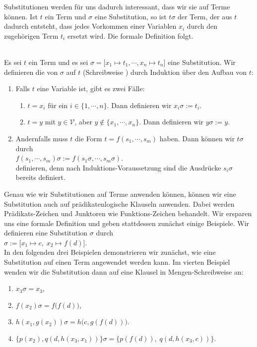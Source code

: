 \noindent
Substitutionen werden für uns dadurch interessant, dass wir sie auf Terme  können.  Ist $t$ ein
Term und $\sigma$ eine Substitution, so ist $t\sigma$ der Term, der aus $t$ dadurch entsteht, dass jedes
Vorkommen einer Variablen $x_i$ durch den zugehörigen Term $t_i$ ersetzt wird.  Die formale Definition folgt. 
\begin{Definition}
\hspace*{\fill} \\
Es sei $t$ ein Term und es sei $\sigma = \bigl[ x_1 \mapsto t_1, \cdots, x_n \mapsto t_n \bigr]$
eine Substitution. Wir definieren die  von $\sigma$ auf $t$
(Schreibweise )  durch Induktion über 
den Aufbau von $t$: 
\begin{enumerate}
\item Falls $t$ eine Variable ist, gibt es zwei Fälle:
  \begin{enumerate}
  \item $t = x_i$ für ein $i\in\{1,\cdots,n\}$.  Dann definieren wir \quad  $x_i\sigma := t_i$.
  \item $t = y$ mit $y\in\mathcal{V}$, aber $y \not\in \{x_1,\cdots,x_n\}$. Dann definieren wir \quad $y\sigma := y$.
  \end{enumerate}
\item Andernfalls muss $t$ die Form $t= f(s_1,\cdots,s_m)$ haben. Dann können wir $t\sigma$ durch \\[0.2cm]
      \hspace*{1.3cm} $f(s_1, \cdots, s_m)\sigma := f(s_1\sigma, \cdots, s_m\sigma)$. \\[0.2cm]
      definieren, denn nach Induktions-Voraussetzung sind die Ausdrücke $s_i\sigma$ bereits definiert.      
      \eox
\end{enumerate}
\end{Definition}

Genau wie wir Substitutionen auf Terme anwenden können, können wir eine Substitution
auch auf prädikatenlogische Klauseln anwenden.  Dabei werden Prädikats-Zeichen und
Junktoren wie Funktions-Zeichen behandelt.
Wir ersparen uns eine formale Definition und geben stattdessen zunächst einige Beispiele. 
Wir definieren eine Substitution $\sigma$ durch \\[0.2cm]
\hspace*{1.3cm} $\sigma := \big[ x_1 \mapsto c,\; x_2 \mapsto f(d) \big]$. \\[0.2cm]
In den folgenden drei Beispielen demonstrieren wir zunächst, wie eine Substitution
auf einen Term angewendet werden kann.  Im vierten Beispiel wenden wir die Substitution
dann auf eine Klausel in Mengen-Schreibweise an:
\begin{enumerate}
\item $x_3\sigma = x_3$,
\item $f(x_2)\sigma = f\bigl(f(d)\bigr)$,
\item $h(x_1,g(x_2))\sigma = h\bigl(c,g(f(d))\bigr)$.
\item $\bigl\{ p(x_2), q(d,h(x_3,x_1))\bigr\}\sigma = \bigl\{ p(f(d)),\; q(d,h(x_3,c))\bigr\}$.
\end{enumerate}


